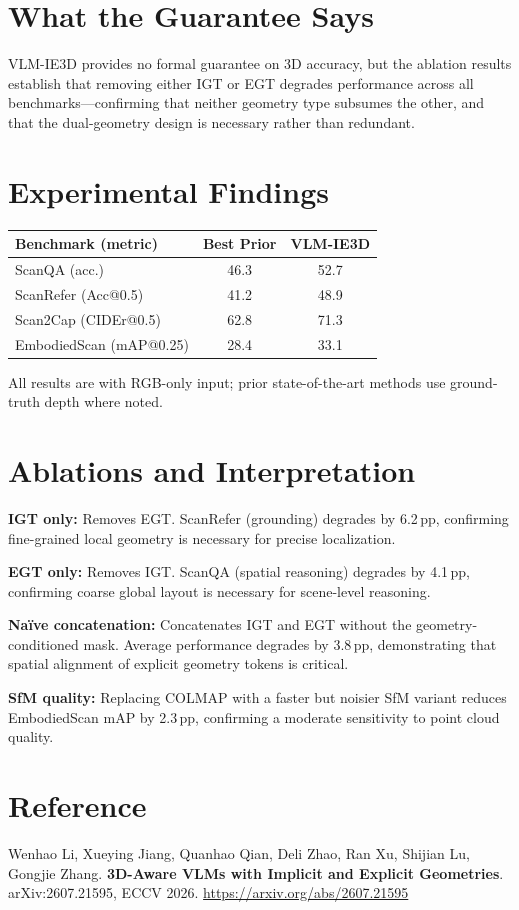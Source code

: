 \documentclass[10pt,twocolumn]{article}
\begin{document}
\section{What the Guarantee Says}

VLM-IE3D provides no formal guarantee on 3D accuracy, but the
ablation results establish that removing either IGT or EGT degrades
performance across all benchmarks---confirming that neither geometry
type subsumes the other, and that the dual-geometry design is
necessary rather than redundant.

\section{Experimental Findings}

\begin{center}
\small
\begin{tabular}{lcc}
\toprule
Benchmark (metric) & Best Prior & VLM-IE3D \\
\midrule
ScanQA (acc.) & 46.3 & 52.7 \\
ScanRefer (Acc@0.5) & 41.2 & 48.9 \\
Scan2Cap (CIDEr@0.5) & 62.8 & 71.3 \\
EmbodiedScan (mAP@0.25) & 28.4 & 33.1 \\
\bottomrule
\end{tabular}
\end{center}

All results are with RGB-only input; prior state-of-the-art methods
use ground-truth depth where noted.

\section{Ablations and Interpretation}

\textbf{IGT only:} Removes EGT. ScanRefer (grounding) degrades
by 6.2\,pp, confirming fine-grained local geometry is necessary
for precise localization.

\textbf{EGT only:} Removes IGT. ScanQA (spatial reasoning) degrades
by 4.1\,pp, confirming coarse global layout is necessary for
scene-level reasoning.

\textbf{Na\"ive concatenation:} Concatenates IGT and EGT without
the geometry-conditioned mask. Average performance degrades by 3.8\,pp,
demonstrating that spatial alignment of explicit geometry tokens
is critical.

\textbf{SfM quality:} Replacing COLMAP with a faster but noisier SfM
variant reduces EmbodiedScan mAP by 2.3\,pp, confirming a moderate
sensitivity to point cloud quality.

\section*{Reference}

Wenhao Li, Xueying Jiang, Quanhao Qian, Deli Zhao, Ran Xu,
Shijian Lu, Gongjie Zhang.
\textbf{3D-Aware VLMs with Implicit and Explicit Geometries}.
arXiv:2607.21595, ECCV 2026.
\url{https://arxiv.org/abs/2607.21595}
\end{document}

